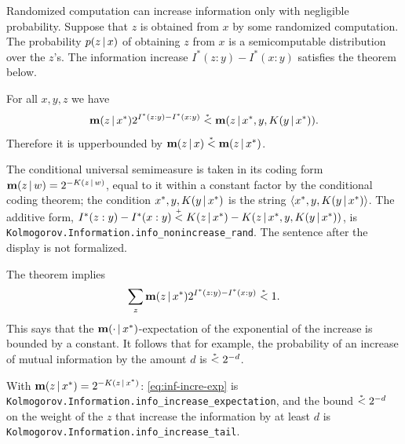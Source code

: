 Randomized computation can increase information only with negligible
probability.
Suppose that \( z \) is obtained from \( x \) by some randomized computation.
The probability \( p(z \,\vert\, x) \) of obtaining \( z \) from \( x \) is a semicomputable
distribution over the \( z \)'s.
The information increase \( I^{*}(z : y) - I^{*}(x : y) \) satisfies the
theorem below. 

 \begin{theorem}
  \label{thm:g3.1.12}
  \leanok
For all \( x, y, z \) we have
 \[
  \mathbf{m}(z \,\vert\, x^{*}) 2^{I^{*}(z : y) - I^{*}(x : y)}
  \stackrel{{}_*}{<} \mathbf{m}(z \,\vert\, x^{*}, y, K(y \,\vert\, x^{*})).
 \]
Therefore it is upperbounded by \( \mathbf{m}(z \,\vert\, x) \stackrel{{}_*}{<} \mathbf{m}(z \,\vert\, x^{*}) \).
 \end{theorem}

\begin{formalization}
The conditional universal semimeasure is taken in its coding form
\( \mathbf{m}(z \,\vert\, w) = 2^{-K(z \,\vert\, w)} \), equal to it within a constant factor by the
conditional coding theorem; the condition \( x^{*}, y, K(y \,\vert\, x^{*}) \) is the string
\( {\mathopen\langle x^{*}, y, K(y \,\vert\, x^{*})\mathclose\rangle} \). The additive form,
\( I^{*}(z : y) - I^{*}(x : y) \stackrel{{}_+}{<} K(z \,\vert\, x^{*}) - K(z \,\vert\, x^{*}, y, K(y \,\vert\, x^{*})) \),
is \texttt{Kolmogorov.Information.info\_nonincrease\_rand}. The sentence after the display is
not formalized.
\end{formalization}

\begin{remark}
  \label{rem:g3.1.16}
The theorem implies
 \begin{equation}\label{eq:inf-incre-exp}
   \sum_{z} \mathbf{m}(z \,\vert\, x^{*}) 2^{I^{*}(z : y) - I^{*}(x : y)} \stackrel{{}_*}{<} 1.
 \end{equation}
This says that
the \( \mathbf{m}(\cdot \,\vert\, x^{*}) \)-expectation of the exponential of the increase
is bounded by a constant.
It follows that for example, 
the probability of an increase of mutual information
by the amount \( d \) is \( \stackrel{{}_*}{<} 2^{-d} \).
\end{remark}

\begin{formalization}
With \( \mathbf{m}(z \,\vert\, x^{*}) = 2^{-K(z \,\vert\, x^{*})} \): \eqref{eq:inf-incre-exp} is
\texttt{Kolmogorov.Information.info\_increase\_expectation}, and the bound \( \stackrel{{}_*}{<} 2^{-d} \)
on the weight of the \( z \) that increase the information by at least \( d \) is
\texttt{Kolmogorov.Information.info\_increase\_tail}.
\end{formalization}

